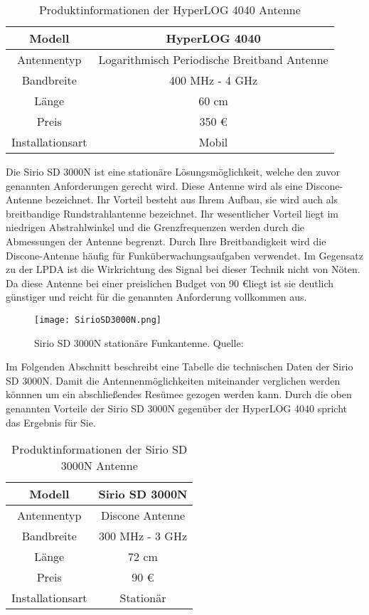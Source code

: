 \begin{table}[H]
	\centering
	\begin{tabular}{c|c}
		Modell & HyperLOG 4040\\
		\hline
		Antennentyp & Logarithmisch Periodische Breitband Antenne\\ 
		\hline 
		Bandbreite & 400 MHz - 4 GHz\\ 
		\hline 
		Länge &  60 cm\\ 
		\hline 
		Preis &  350 \euro \\ 
		\hline 
		Installationsart & Mobil\\ 
		
	\end{tabular} 
	\caption{Produktinformationen der HyperLOG 4040 Antenne}
\end{table}

Die Sirio SD 3000N ist eine stationäre Lösungsmöglichkeit, welche den zuvor genannten Anforderungen gerecht wird. Diese Antenne wird als eine Discone-Antenne bezeichnet. Ihr Vorteil besteht aus Ihrem Aufbau, sie wird auch als breitbandige Rundstrahlantenne bezeichnet. Ihr wesentlicher Vorteil liegt im niedrigen Abstrahlwinkel und die Grenzfrequenzen werden durch die Abmessungen der Antenne begrenzt. Durch Ihre Breitbandigkeit wird die Discone-Antenne häufig für Funküberwachungsaufgaben verwendet. Im Gegensatz zu der LPDA ist die Wirkrichtung des Signal bei dieser Technik nicht von Nöten. Da diese Antenne bei einer preislichen Budget von 90 \euro liegt ist sie deutlich günstiger und reicht für die genannten Anforderung vollkommen aus.


\begin{figure}[H]
	\centering
	\texttt{[image: SirioSD3000N.png]}
	\caption[Sirio SD 3000N stationäre Funkantenne]{Sirio SD 3000N stationäre Funkantenne. Quelle: \cite{Funktechnik:2018}} 
	\label{Sirio SD 3000N Antenne}
\end{figure}

Im Folgenden Abschnitt beschreibt eine Tabelle die technischen Daten der Sirio SD 3000N. Damit die Antennenmöglichkeiten miteinander verglichen werden könnnen um ein abschließendes Resümee gezogen werden kann. Durch die oben genannten Vorteile der Sirio SD 3000N gegenüber der HyperLOG 4040 spricht das Ergebnis für Sie. 

\begin{table}[H]
	\centering
	\begin{tabular}{c|c}
		Modell & Sirio SD 3000N\\
		\hline
		Antennentyp & Discone Antenne\\ 
		\hline 
		Bandbreite & 300 MHz - 3 GHz\\ 
		\hline 
		Länge &  72 cm\\ 
		\hline 
		Preis &  90 \euro \\ 
		\hline 
		Installationsart & Stationär\\ 
		
	\end{tabular} 
	\caption{Produktinformationen der Sirio SD 3000N Antenne}
\end{table}


